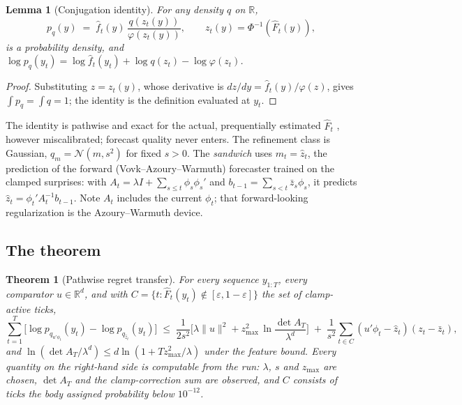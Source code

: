 \documentclass[article]{jss}
\newtheorem{theorem}{Theorem}
\newtheorem{lemma}{Lemma}
\theoremstyle{remark}
\newcommand{\R}{\mathbb{R}}
\newcommand{\zmax}{z_{\max}}
\begin{document}
\begin{lemma}[Conjugation identity] \label{lem:conj}
For any density $q$ on $\R$,
\[
p_q(y) \;=\; \hat f_t(y)\, \frac{q(z_t(y))}{\varphi(z_t(y))},
\qquad z_t(y) = \Phi^{-1}(\hat F_t(y)),
\]
is a probability density, and $\log p_q(y_t) = \log \hat f_t(y_t) + \log
q(z_t) - \log \varphi(z_t)$.
\end{lemma}

\begin{proof}
Substituting $z = z_t(y)$, whose derivative is $dz/dy = \hat
f_t(y)/\varphi(z)$, gives $\int p_q = \int q = 1$; the identity is the
definition evaluated at $y_t$.
\end{proof}

The identity is pathwise and exact for the actual, prequentially estimated
$\hat F_t$ \citep{dawid1984}, however miscalibrated; forecast quality never
enters. The refinement class is Gaussian, $q_m = \mathcal N(m, s^2)$ for
fixed $s > 0$. The \emph{sandwich} uses $m_t = \hat z_t$, the prediction of
the forward (Vovk--Azoury--Warmuth) forecaster
\citep{vovk2001,azoury2001,cesabianchi2006} trained on the clamped surprises:
with $A_t = \lambda I + \sum_{s \le t} \phi_s \phi_s'$ and $b_{t-1} =
\sum_{s < t} \bar z_s \phi_s$, it predicts $\hat z_t = \phi_t' A_t^{-1}
b_{t-1}$. Note $A_t$ includes the current $\phi_t$; that forward-looking
regularization is the Azoury--Warmuth device.

\subsection{The theorem}

\begin{theorem}[Pathwise regret transfer] \label{thm:main}
For every sequence $y_{1:T}$, every comparator $u \in \R^d$, and with $C =
\{t : \hat F_t(y_t) \notin [\varepsilon, 1-\varepsilon]\}$ the set of
clamp-active ticks,
\[
\sum_{t=1}^T \Big[\log p_{q_{u'\phi_t}}(y_t) - \log p_{q_{\hat z_t}}(y_t)\Big]
\;\le\; \frac{1}{2s^2}\Big[\lambda \|u\|^2 + \zmax^2 \,
\ln \frac{\det A_T}{\lambda^d}\Big]
\;+\; \frac{1}{s^2}\sum_{t \in C} (u'\phi_t - \hat z_t)(z_t - \bar z_t),
\]
and $\ln(\det A_T/\lambda^d) \le d\ln(1 + T\zmax^2/\lambda)$ under the
feature bound. Every quantity on the right-hand side is computable from the
run: $\lambda$, $s$ and $\zmax$ are chosen, $\det A_T$ and the
clamp-correction sum are observed, and $C$ consists of ticks the body
assigned probability below $10^{-12}$.
\end{theorem}
\end{document}
